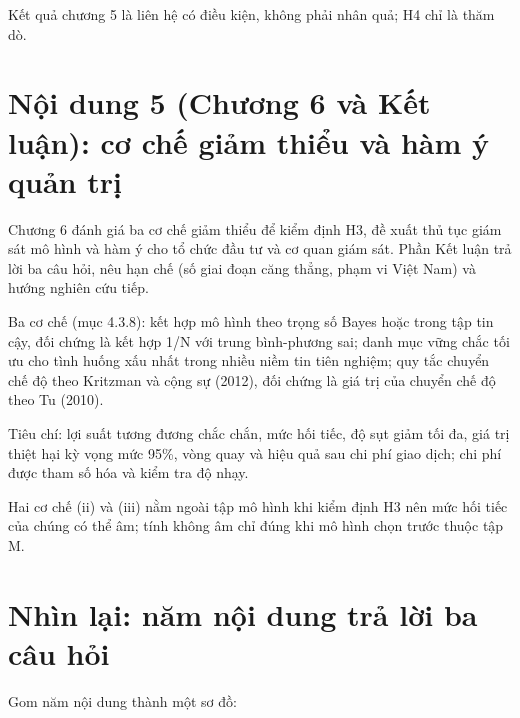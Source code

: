 Kết quả chương 5 là liên hệ có điều kiện, không phải nhân quả; H4 chỉ là thăm dò.

\section{Nội dung 5 (Chương 6 và Kết luận): cơ chế giảm thiểu và hàm ý quản trị}

Chương 6 đánh giá ba cơ chế giảm thiểu để kiểm định H3, đề xuất thủ tục giám sát mô hình và hàm ý cho tổ chức đầu tư và cơ quan giám sát. Phần Kết luận trả lời ba câu hỏi, nêu hạn chế (số giai đoạn căng thẳng, phạm vi Việt Nam) và hướng nghiên cứu tiếp.

Ba cơ chế (mục 4.3.8): kết hợp mô hình theo trọng số Bayes hoặc trong tập tin cậy, đối chứng là kết hợp 1/N với trung bình-phương sai; danh mục vững chắc tối ưu cho tình huống xấu nhất trong nhiều niềm tin tiên nghiệm; quy tắc chuyển chế độ theo Kritzman và cộng sự (2012), đối chứng là giá trị của chuyển chế độ theo Tu (2010).

Tiêu chí: lợi suất tương đương chắc chắn, mức hối tiếc, độ sụt giảm tối đa, giá trị thiệt hại kỳ vọng mức 95\%, vòng quay và hiệu quả sau chi phí giao dịch; chi phí được tham số hóa và kiểm tra độ nhạy.

Hai cơ chế (ii) và (iii) nằm ngoài tập mô hình khi kiểm định H3 nên mức hối tiếc của chúng có thể âm; tính không âm chỉ đúng khi mô hình chọn trước thuộc tập M.

\section{Nhìn lại: năm nội dung trả lời ba câu hỏi}

Gom năm nội dung thành một sơ đồ:

